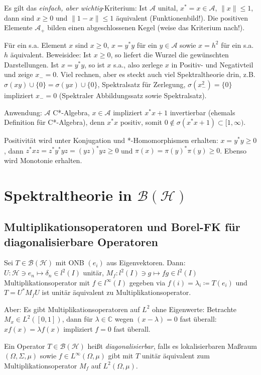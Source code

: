 \documentclass[11pt,a4paper]{scrartcl}
\newcommand{\C}{\mathbb{C}} %
\newcommand{\Hc}{\mathcal{H}}
\newcommand{\A}{\mathcal{A}}
\newcommand{\B}{\mathcal{B}}
\theoremstyle{plain}
\theoremstyle{definition}
\theoremstyle{remark}
\begin{document}
Es gilt das \emph{einfach, aber wichtig}-Kriterium: Ist $\A$ unital, $x^*=x\in \A$, $\|x\| \leq 1$, dann sind $x\geq 0$ und $\|1-x\|\leq 1$ äquivalent (Funktionenbild!). Die positiven Elemente $\A_+$ bilden einen abgeschlossenen Kegel (weise das Kriterium nach!).

Für ein s.a. Element $x$ sind $x\geq 0$, $x=y^*y$ für ein $y\in \A$ sowie $x=h^2$ für ein s.a. $h$ äquivalent. Beweisidee: Ist $x \geq 0$, so liefert die Wurzel die gewünschten Darstellungen. Ist $x=y^*y$, so ist $x$ s.a., also zerlege $x$ in Positiv- und Negativteil und zeige $x_-=0$. Viel rechnen, aber es steckt auch viel Spektraltheorie drin, z.B. $\sigma(xy) \cup \{0\} = \sigma(yx) \cup \{0 \}$, Spektralsatz für Zerlegung, $\sigma(x_-^2)=\{0\}$ impliziert $x_-=0$ (Spektraler Abbildungssatz sowie Spektralsatz).

Anwendung: $\A$ C*-Algebra, $x\in \A$ impliziert $x^*x+1$ invertierbar (ehemals Definition für C*-Algebra), denn $x^*x$ positiv, somit $0\not\in \sigma(x^*x+1) \subset [1,\infty)$.

Positivität wird unter Konjugation und *-Homomorphismen erhalten: $x=y^*y\geq 0$, dann $z^*xz=z^*y^*yz=(yz)^*yz \geq0$ und $\pi(x)=\pi(y)^*\pi(y) \geq 0$. Ebenso wird Monotonie erhalten.

\section{Spektraltheorie in $\B(\Hc)$}

\subsection{Multiplikationsoperatoren und Borel-FK für diagonalisierbare Operatoren}

Sei $T\in \B(\Hc)$ mit ONB $(e_i)$ aus Eigenvektoren. Dann: $U: \Hc \ni e_n \mapsto \delta_n \in l^2(I)$ unitär, $M_f: l^2(I) \ni g \mapsto fg \in l^2(I)$ Multiplikationsoperator mit $f\in l^\infty(I)$ gegeben via $f(i)=\lambda_i\coloneqq T(e_i)$ und $T=U^*M_f U$ ist unitär äquivalent zu Multiplikationsoperator.

Aber: Es gibt Multiplikationsoperatoren auf $L^2$ ohne Eigenwerte: Betrachte $M_x \in L^2([0,1])$, dann für $\lambda\in\C$ wegen $(x-\lambda)=0$ fast überall: $x f(x) = \lambda f(x)$ impliziert $f=0$ fast überall.

Ein Operator $T\in \B(\Hc)$ heißt \emph{diagonalisierbar}, falls es lokalisierbaren Maßraum $(\Omega, \Sigma, \mu)$ sowie $f\in L^\infty(\Omega, \mu)$ gibt mit $T$ unitär äquivalent zum Multiplikationsoperator $M_f$ auf $L^2(\Omega, \mu)$.
\end{document}
